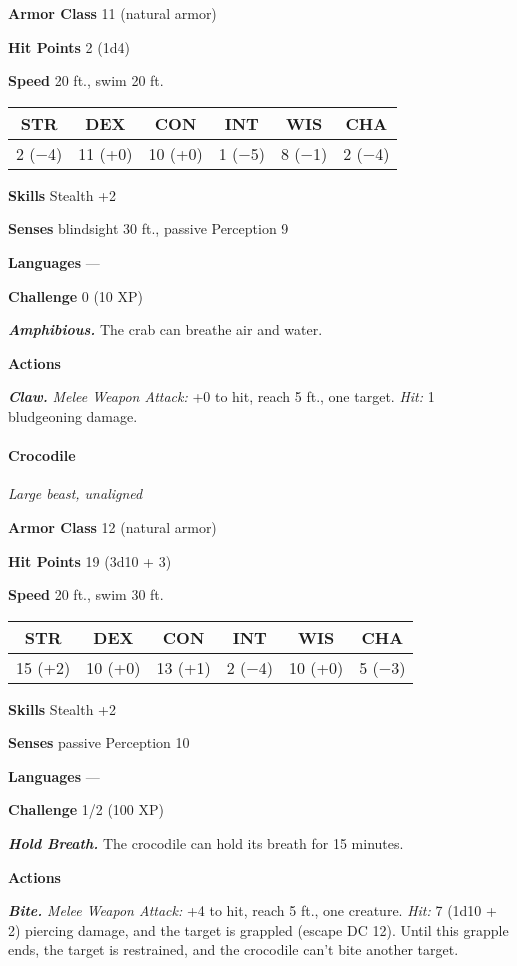 \documentclass[
]{article}
\begin{document}
\textbf{Armor Class} 11 (natural armor)

\textbf{Hit Points} 2 (1d4)

\textbf{Speed} 20 ft., swim 20 ft.

\begin{longtable}[]{@{}cccccc@{}}
\toprule
STR & DEX & CON & INT & WIS & CHA\tabularnewline
\midrule
\endhead
2 (−4) & 11 (+0) & 10 (+0) & 1 (−5) & 8 (−1) & 2 (−4)\tabularnewline
\bottomrule
\end{longtable}

\textbf{Skills} Stealth +2

\textbf{Senses} blindsight 30 ft., passive Perception 9

\textbf{Languages} ---

\textbf{Challenge} 0 (10 XP)

\emph{\textbf{Amphibious.}} The crab can breathe air and water.

\textbf{Actions}

\emph{\textbf{Claw.}} \emph{Melee Weapon Attack:} +0 to hit, reach 5
ft., one target. \emph{Hit:} 1 bludgeoning damage.

\hypertarget{crocodile}{%
\paragraph{Crocodile}\label{crocodile}}

\emph{Large beast, unaligned}

\textbf{Armor Class} 12 (natural armor)

\textbf{Hit Points} 19 (3d10 + 3)

\textbf{Speed} 20 ft., swim 30 ft.

\begin{longtable}[]{@{}cccccc@{}}
\toprule
STR & DEX & CON & INT & WIS & CHA\tabularnewline
\midrule
\endhead
15 (+2) & 10 (+0) & 13 (+1) & 2 (−4) & 10 (+0) & 5 (−3)\tabularnewline
\bottomrule
\end{longtable}

\textbf{Skills} Stealth +2

\textbf{Senses} passive Perception 10

\textbf{Languages} ---

\textbf{Challenge} 1/2 (100 XP)

\emph{\textbf{Hold Breath.}} The crocodile can hold its breath for 15
minutes.

\textbf{Actions}

\emph{\textbf{Bite.}} \emph{Melee Weapon Attack:} +4 to hit, reach 5
ft., one creature. \emph{Hit:} 7 (1d10 + 2) piercing damage, and the
target is grappled (escape DC 12). Until this grapple ends, the target
is restrained, and the crocodile can't bite another target.
\end{document}

